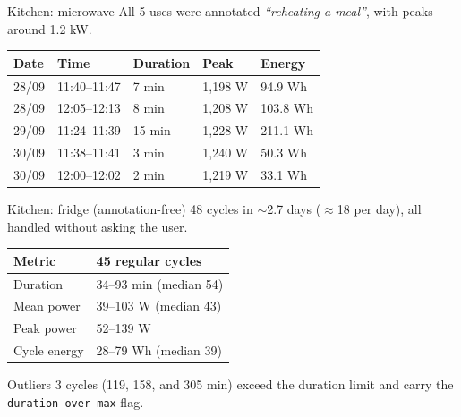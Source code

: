 


\begin{frame}{Kitchen: microwave}
  \small
  All 5 uses were annotated \emph{``reheating a meal''}, with peaks around
  1.2 kW.

  \vspace{0.25cm}
  \renewcommand{\arraystretch}{1.5}
  \begin{tabular}{p{}|p{}|p{}|p{}|p{}}
    \textbf{Date} & \textbf{Time} & \textbf{Duration} & \textbf{Peak} & \textbf{Energy} \\
    \hline
    28/09 & 11:40--11:47 & 7 min & 1,198 W & 94.9 Wh \\
    28/09 & 12:05--12:13 & 8 min & 1,208 W & 103.8 Wh \\
    29/09 & 11:24--11:39 & 15 min & 1,228 W & 211.1 Wh \\
    30/09 & 11:38--11:41 & 3 min & 1,240 W & 50.3 Wh \\
    30/09 & 12:00--12:02 & 2 min & 1,219 W & 33.1 Wh \\
  \end{tabular}
\end{frame}

\begin{frame}{Kitchen: fridge (annotation-free)}
  \small
  \alert{48 cycles in $\sim$2.7 days} ($\approx$18 per day), all handled without
  asking the user.

  \vspace{0.1cm}
  \small
  \renewcommand{\arraystretch}{1.15}
  \begin{tabular}{L{0.22\textwidth}|L{0.3\textwidth}}
    \textbf{Metric} & \textbf{45 regular cycles} \\
    \hline
    Duration & 34--93 min (median 54) \\
    Mean power & 39--103 W (median 43) \\
    Peak power & 52--139 W \\
    Cycle energy & 28--79 Wh (median 39) \\
  \end{tabular}

  \vspace{0.1cm}
  \footnotesize
  \begin{alertblock}{Outliers}
    3 cycles (119, 158, and 305 min) exceed the duration limit and carry the
    \texttt{duration-over-max} flag.
  \end{alertblock}
\end{frame}
